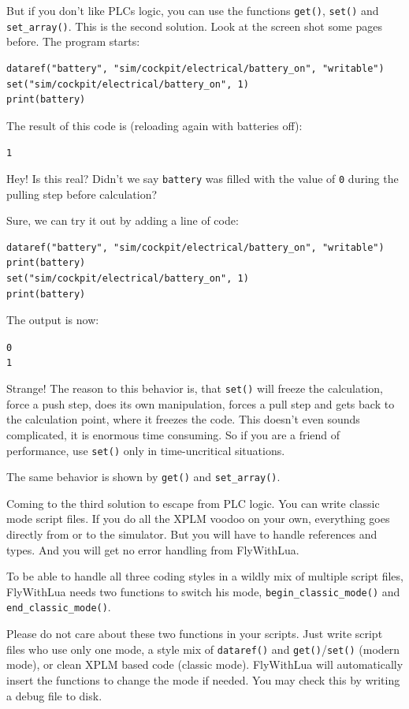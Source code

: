 \documentclass[11pt,parskip=half,a4paper]{scrartcl}
\begin{document}
\newpage
But if you don't like PLCs logic, you can use the functions \verb|get()|, \verb|set()| and \verb|set_array()|. This is the second solution. Look at the screen shot some pages before. The program starts:

\begin{lstlisting}
dataref("battery", "sim/cockpit/electrical/battery_on", "writable")
set("sim/cockpit/electrical/battery_on", 1)
print(battery)
\end{lstlisting}

The result of this code is (reloading again with batteries off):

\verb|1|

Hey! Is this real? Didn't we say \verb|battery| was filled with the value of \verb|0| during the pulling step before calculation?

Sure, we can try it out by adding a line of code:

\begin{lstlisting}
dataref("battery", "sim/cockpit/electrical/battery_on", "writable")
print(battery)
set("sim/cockpit/electrical/battery_on", 1)
print(battery)
\end{lstlisting}

The output is now:

\verb|0|\\
\verb|1|

Strange! The reason to this behavior is, that \verb|set()| will freeze the calculation, force a push step, does its own manipulation, forces a pull step and gets back to the calculation point, where it freezes the code. This doesn't even sounds complicated, it is enormous time consuming. So if you are a friend of performance, use \verb|set()| only in time-uncritical situations.

The same behavior is shown by \verb|get()| and \verb|set_array()|.

Coming to the third solution to escape from PLC logic. You can write classic mode script files. If you do all the XPLM voodoo on your own, everything goes directly from or to the simulator. But you will have to handle references and types. And you will get no error handling from FlyWithLua.

To be able to handle all three coding styles in a wildly mix of multiple script files, FlyWithLua needs two functions to switch his mode, \verb|begin_classic_mode()| and \verb|end_classic_mode()|.

Please do not care about these two functions in your scripts. Just write script files who use only one mode, a style mix of \verb|dataref()| and \verb|get()|/\verb|set()| (modern mode), or clean XPLM based code (classic mode). FlyWithLua will automatically insert the functions to change the mode if needed. You may check this by writing a debug file to disk.
\end{document}
